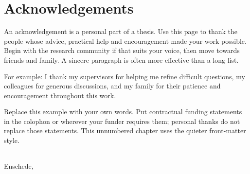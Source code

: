 
\chapter*{Acknowledgements}
An acknowledgement is a personal part of a thesis. Use this page to thank the
people whose advice, practical help and encouragement made your work possible.
Begin with the research community if that suits your voice, then move towards
friends and family. A sincere paragraph is often more effective than a long list.

For example: I thank my supervisors for helping me refine difficult questions,
my colleagues for generous discussions, and my family for their patience and
encouragement throughout this work.

Replace this example with your own words. Put contractual funding statements in
the colophon or wherever your funder requires them; personal thanks do not replace
those statements. This unnumbered chapter uses the quieter front-matter style.

\vspace{1cm}
\noindent\thesisauthor\\
Enschede, 
